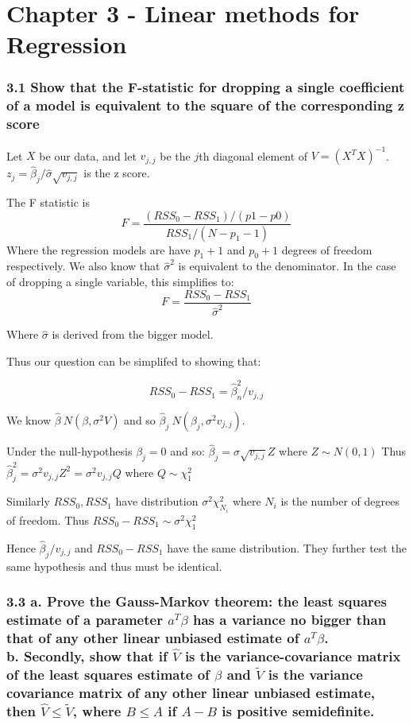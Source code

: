 

\chapter{Chapter 3 - Linear methods for Regression}

\subsection*{3.1 Show that the F-statistic for dropping a single coefficient of a model is equivalent to the square of the corresponding z score}

Let $X$ be our data, and let $v_{j,j}$ be the $j$th diagonal element of $V = (X^T X)^{-1}$. $z_j = \hat{\beta}_j / \hat{\sigma} \sqrt{v_{j,j}}$ is the z score. 

The F statistic is $$ F = \frac{(RSS_0 - RSS_1) / (p1 - p0)}{RSS_1 / (N - p_1 - 1)}$$
Where the regression models are have $p_1 + 1$ and $p_0 + 1$ degrees of freedom respectively.
We also know that $\hat{\sigma}^2$ is equivalent to the denominator. In the case of dropping a single variable, this simplifies to:
$$ F = \frac{RSS_0 - RSS_1}{\hat{\sigma}^2}$$

Where $\hat{\sigma}$ is derived from the bigger model.

Thus our question can be simplifed to showing that: 

$$ RSS_0 - RSS_1 = \hat{\beta}_n^2 /  v_{j,j} $$

We know $\hat{\beta} ~ N(\beta, \sigma^2 V)$ and so $\hat{\beta}_j ~ N(\beta_j, \sigma^2 v_{j,j})$.

Under the null-hypothesis $\beta_j = 0$ and so: $\hat{\beta}_j = \sigma \sqrt{v_{j,j}} Z$ where $Z \sim N(0,1)$
Thus $\hat{\beta}^2_j = \sigma^2 v_{j,j} Z^2 = \sigma^2 v_{j,j} Q$ where $Q \sim \chi^2_1$

Similarly $RSS_0, RSS_1$ have distribution $\sigma^2 \chi^2_{N_i}$ where $N_i$ is the number of degrees of freedom. Thus $RSS_0 - RSS_1  \sim \sigma^2 \chi^2_1$

Hence $\hat{\beta}_j / v_{j,j}$ and $RSS_0 - RSS_1$ have the same distribution. They further test the same hypothesis and thus must be identical.



\subsection*{3.3 
a. Prove the Gauss-Markov theorem: the least squares estimate of a parameter $a^T\beta$ has a variance no bigger than that of any other linear unbiased estimate of $a^T\beta$.\\
b. Secondly, show that if $\hat{V}$ is the variance-covariance matrix of the least squares estimate of $\beta$ and $\tilde{V}$ is the variance covariance matrix of any other linear unbiased estimate, then $\hat{V} \leq \tilde{V}$, where $B \leq A$ if $A - B$ is positive semidefinite.}


